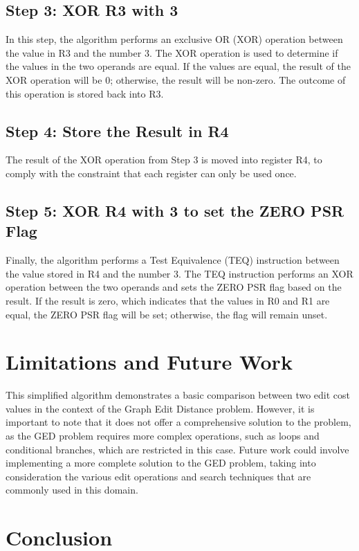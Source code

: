 \subsection{Step 3: XOR R3 with 3}
In this step, the algorithm performs an exclusive OR (XOR) operation between the value in R3 and the number 3. The XOR operation is used to determine if the values in the two operands are equal. If the values are equal, the result of the XOR operation will be 0; otherwise, the result will be non-zero. The outcome of this operation is stored back into R3.

\subsection{Step 4: Store the Result in R4}
The result of the XOR operation from Step 3 is moved into register R4, to comply with the constraint that each register can only be used once.

\subsection{Step 5: XOR R4 with 3 to set the ZERO PSR Flag}
Finally, the algorithm performs a Test Equivalence (TEQ) instruction between the value stored in R4 and the number 3. The TEQ instruction performs an XOR operation between the two operands and sets the ZERO PSR flag based on the result. If the result is zero, which indicates that the values in R0 and R1 are equal, the ZERO PSR flag will be set; otherwise, the flag will remain unset.

\section{Limitations and Future Work}
This simplified algorithm demonstrates a basic comparison between two edit cost values in the context of the Graph Edit Distance problem. However, it is important to note that it does not offer a comprehensive solution to the problem, as the GED problem requires more complex operations, such as loops and conditional branches, which are restricted in this case. Future work could involve implementing a more complete solution to the GED problem, taking into consideration the various edit operations and search techniques that are commonly used in this domain.

\section{Conclusion}

